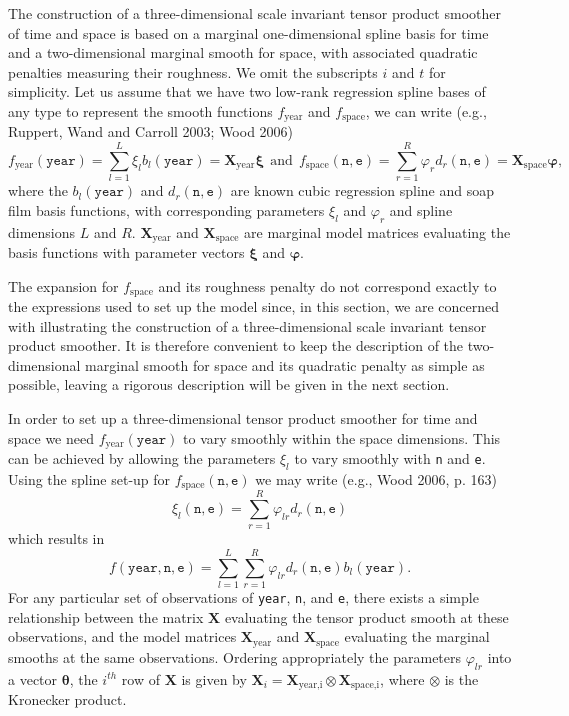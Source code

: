 \documentclass[10pt] {article}
\theoremstyle{definition}
\theoremstyle{plain}
\begin{document}
The construction of a three-dimensional scale invariant tensor product smoother of time and space is based on a marginal one-dimensional spline basis for time and a two-dimensional marginal smooth for space, with associated quadratic penalties measuring their roughness. We omit the subscripts $i$ and $t$ for simplicity. Let us assume that we have two low-rank regression spline bases of any type to represent the smooth functions $f_\text{year}$ and $f_\text{space}$, we can write (e.g., Ruppert, Wand and Carroll 2003; Wood 2006)
$$
f_\text{year}(\texttt{year})=\sum_{l=1}^L \xi_l b_l(\texttt{year})=\textbf{X}_\text{year}\bm\xi \ \ \text{and} \ \ f_\text{space}(\texttt{n},\texttt{e})=\sum_{r=1}^R \varphi_r d_r(\texttt{n},\texttt{e})=\textbf{X}_\text{space}\bm\varphi,
$$
where the $b_l(\texttt{year})$ and $d_r(\texttt{n},\texttt{e})$ are known cubic regression spline and soap film basis functions, with corresponding parameters $\xi_l$ and $\varphi_r$ and spline dimensions $L$ and $R$. $\textbf{X}_\text{year}$ and $\textbf{X}_\text{space}$ are marginal model matrices evaluating the basis functions with parameter vectors $\bm\xi$ and $\bm\varphi$. 

The expansion for $f_\text{space}$ and its roughness penalty do not correspond exactly to the expressions used to set up the model since, in this section, we are concerned with illustrating the construction of a three-dimensional scale invariant tensor product smoother. It is therefore convenient to keep the description of the two-dimensional marginal smooth for space and its quadratic penalty as simple as possible, leaving a rigorous description will be given in the next section. 

In order to set up a three-dimensional tensor product smoother for time and space we need $f_\text{year}(\texttt{year})$ to vary smoothly within the space dimensions. This can be achieved by allowing the parameters $\xi_l$ to vary smoothly with \texttt{n} and \texttt{e}. Using the spline set-up for $f_\text{space}(\texttt{n},\texttt{e})$ we may write (e.g., Wood 2006, p. 163)
$$
\xi_l(\texttt{n},\texttt{e})=\sum_{r=1}^R \varphi_{lr} d_r(\texttt{n},\texttt{e})
$$    
which results in
$$
f(\texttt{year},\texttt{n},\texttt{e})=\sum_{l=1}^L \sum_{r=1}^R \varphi_{lr} d_r(\texttt{n},\texttt{e}) b_l(\texttt{year}). 
$$
For any particular set of observations of \texttt{year}, \texttt{n}, and \texttt{e}, there exists a simple relationship between the matrix $\textbf{X}$ evaluating the tensor product smooth at these observations, and the model matrices $\textbf{X}_\text{year}$ and $\textbf{X}_\text{space}$ evaluating the marginal smooths at the same observations. Ordering appropriately the parameters $\varphi_{lr}$ into a vector $\bm\theta$, the $i^{th}$ row of $\textbf{X}$ is given by $\textbf{X}_{i}=\textbf{X}_\text{year,i}\otimes\textbf{X}_\text{space,i}$, where $\otimes$ is the Kronecker product. 
\end{document}
